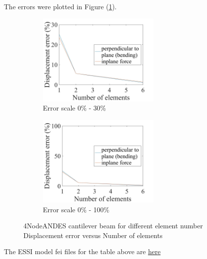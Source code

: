 \documentclass[fleqn,11pt,letter]{article}
\begin{document}

The errors were plotted in Figure (\ref{fig error 4NodeANDES cantilever beam for different element number}).

\begin{figure}[H]
  \begin{subfigure}{0.5\textwidth}
    \centering
    \includegraphics[width=6cm]{../Figure_files/4NodeANDES/error4andes_beam_different_element_number.jpeg}
    \caption{Error scale 0\% - 30\%}
  \end{subfigure}
  \begin{subfigure}{0.5\textwidth}
    \centering
    \includegraphics[width=6cm]{../Figure_files/4NodeANDES/error4andes_beam_different_element_number100.jpeg}
    \caption{Error scale 0\% - 100\%}
  \end{subfigure}
  \captionsetup{justification=centering,margin=2cm}
  \caption{4NodeANDES cantilever beam for different element number\\
    Displacement error   versus   Number of elements}
  \label{fig error 4NodeANDES cantilever beam for different element number}
\end{figure}


The ESSI model fei files for the table above are \href{https://github.com/yuan-energy/ESSI_Verification/blob/master/4NodeANDES/cantilever_different_element_number/cantilever_different_element_number.tar.gz?raw=true}{here}
\end{document}
